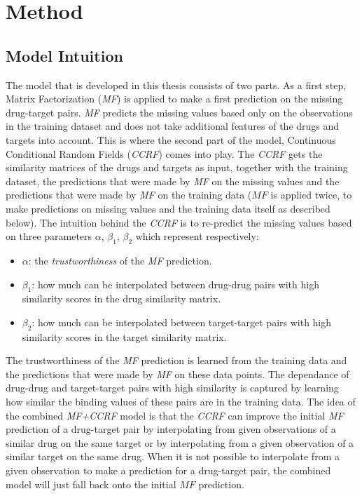 
\chapter{Method}

\section{Model Intuition}
\label{mod:intuition}
The model that is developed in this thesis consists of two parts. As a first step, Matrix Factorization (\textit{MF}) is applied to make a first prediction on the missing drug-target pairs. \textit{MF} predicts the missing values based only on the observations in the training dataset and does not take additional features of the drugs and targets into account. This is where the second part of the model, Continuous Conditional Random Fields (\textit{CCRF}) comes into play. The \textit{CCRF} gets the similarity matrices of the drugs and targets as input, together with the training dataset, the predictions that were made by \textit{MF} on the missing values and the predictions that were made by \textit{MF} on the training data ($MF$ is applied twice, to make predictions on missing values and the training data itself as described below). The intuition behind the \textit{CCRF} is to re-predict the missing values based on three parameters $\alpha$, $\beta_1$, $\beta_2$ which represent respectively:
\begin{itemize}
\item $\alpha$: the \textit{trustworthiness} of the \textit{MF} prediction. 
\item $\beta_1$: how much can be interpolated between drug-drug pairs with high similarity scores in the drug similarity matrix.
\item $\beta_2$: how much can be interpolated between target-target pairs with high similarity scores in the target similarity matrix.
\end{itemize}
The trustworthiness of the \textit{MF} prediction is learned from the training data and the predictions that were made by \textit{MF} on these data points. The dependance of drug-drug and target-target pairs with high similarity is captured by learning how similar the binding values of these pairs are in the training data. The idea of the combined \textit{MF+CCRF} model is that the \textit{CCRF} can improve the initial \textit{MF} prediction of a drug-target pair by interpolating from given observations of a similar drug on the same target or by interpolating from a given observation of a similar target on the same drug. When it is not possible to interpolate from a given observation to make a prediction for a drug-target pair, the combined model will just fall back onto the initial $MF$ prediction.

